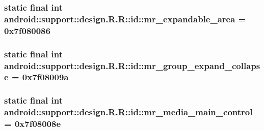 \hypertarget{classandroid_1_1support_1_1design_1_1_r_1_1id_4afa3d7f8858d1f8f2560f5bf1596a95}{
\subsubsection[{mr\_\-expandable\_\-area}]{\setlength{\rightskip}{0pt plus 5cm}static final int android::support::design.R.R::id::mr\_\-expandable\_\-area = 0x7f080086}}
\label{classandroid_1_1support_1_1design_1_1_r_1_1id_4afa3d7f8858d1f8f2560f5bf1596a95}


\hypertarget{classandroid_1_1support_1_1design_1_1_r_1_1id_c3ee0902041abba5465234b2f8d1a311}{
\subsubsection[{mr\_\-group\_\-expand\_\-collapse}]{\setlength{\rightskip}{0pt plus 5cm}static final int android::support::design.R.R::id::mr\_\-group\_\-expand\_\-collapse = 0x7f08009a}}
\label{classandroid_1_1support_1_1design_1_1_r_1_1id_c3ee0902041abba5465234b2f8d1a311}


\hypertarget{classandroid_1_1support_1_1design_1_1_r_1_1id_278fc433b48be3a1eb3492e5ac1f56c1}{
\subsubsection[{mr\_\-media\_\-main\_\-control}]{\setlength{\rightskip}{0pt plus 5cm}static final int android::support::design.R.R::id::mr\_\-media\_\-main\_\-control = 0x7f08008e}}
\label{classandroid_1_1support_1_1design_1_1_r_1_1id_278fc433b48be3a1eb3492e5ac1f56c1}


